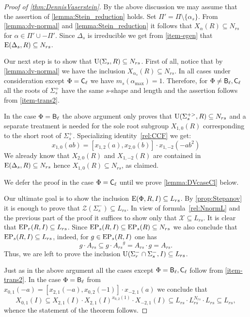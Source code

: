 \begin{proof}[Proof of \cref{thm:DennisVaserstein}]
By the above discussion we may assume that the assertion of \cref{lemma:Stein_reduction} holds.
Set $\Pi' = \Pi \setminus \{\alpha_s\}$.
From \cref{lemma:dv-normal} and \cref{lemma:Stein_reduction} it follows that $X_\alpha(R) \subseteq N_{rs}$ for $\alpha \in \Pi' \cup -\Pi'$.
Since $\Delta_s$ is irreducible we get from \cref{item-egen} that $\operatorname{E}(\Delta_s, R) \subseteq N_{rs}$.

Our next step is to show that $\operatorname{U}(\Sigma_s, R) \subseteq N_{rs}$.
First of all, notice that by \cref{lemma:dv-normal} we have the inclusion $X_{\alpha_s}(R) \subseteq N_{rs}$.
In all cases under consideration except $\Phi=\mathsf{C}_\ell$ we have $m_s(\alpha_{\mathrm{max}})=1$.
Therefore, for $\Phi\neq \mathsf{B}_\ell, \mathsf{C}_\ell$ all the roots of $\Sigma^+_s$ have the same $s$-shape and length and the assertion follows from \cref{item-trans2}.

In the case $\Phi=\mathsf{B}_\ell$ the above argument only proves that $\operatorname{U}(\Sigma_s^{+>}, R) \subseteq N_{rs}$ and a separate treatment is needed for the sole root subgroup $X_{1,0}(R)$ corresponding to the short root of $\Sigma_s^+$.
Specializing identity~\eqref{rel:CCF} we get:
\begin{equation*} \label{rel:CCF-specBC} x_{1,0}(ab) = [x_{1, 2}(a), x_{2, 0}(b)] \cdot x_{1,-2}(-a b^2) \end{equation*}
We already know that $X_{2, 0}(R)$ and $X_{1,-2}(R)$ are contained in $\operatorname{E}(\Delta_s, R) \subseteq N_{rs}$ hence $X_{1,0}(R) \subseteq N_{rs}$, as claimed.

We defer the proof in the case $\Phi=\mathsf{C}_\ell$ until we prove \cref{lemma:DVcaseCl} below.

Our ultimate goal is to show the inclusion $\operatorname{E}(\Phi, R, I) \subseteq L_{rs}$. 
By \cref{prop:Stepanov} it is enough to prove that $\mathcal{Z}(\Sigma^-_s) \subseteq L_{rs}$.
In view of formula~\eqref{rel:NnormL} and the previous part of the proof it suffices to show only that $\mathcal{X} \subseteq L_{rs}$.
It is clear that $\operatorname{EP}_r(R, I) \subseteq L_{rs}$.
Since $\operatorname{EP}_s(R, I) \subseteq \operatorname{EP}_s(R) \subseteq N_{rs}$ we also conclude that $\operatorname{EP}_s(R, I) \subseteq L_{rs}$, indeed, for $g \in \operatorname{EP}_s(R,I)$ one has
\[ g \cdot A_{rs} \subseteq g \cdot {A_{rs}}^g = A_{rs} \cdot g = A_{rs}. \]
Thus, we are left to prove the inclusion $\operatorname{U}(\Sigma^-_r \cap \Sigma^-_s, I) \subseteq L_{rs}$.

Just as in the above argument all the cases except $\Phi = \mathsf{B}_\ell, \mathsf{C}_\ell$ follow from \cref{item-trans2}.
In the case $\Phi=\mathsf{B}_\ell$ from $x_{0, 1}(-a) = [x_{2,1}(-a), x_{0, 2}(-1)]\cdot x_{-2,1}(a)$ we conclude that
$$X_{0,1}(I) \subseteq X_{2,1}(I) \cdot X_{2,1}(I)^{x_{0,2}(1)} \cdot X_{-2,1}(I) \subseteq L_{rs} \cdot L_{rs}^{N_{rs}} \cdot L_{rs} \subseteq L_{rs},$$
whence the statement of the theorem follows. \end{proof}

